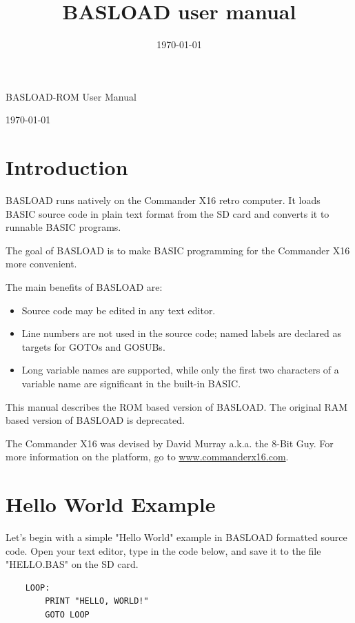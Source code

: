 \documentclass{article}
\title{BASLOAD user manual}
\date{\today}
\begin{document}
\begin{huge}
    BASLOAD-ROM User Manual
\end{huge}

\vspace{1em}
\today

\vspace{4em}
\tableofcontents
\vspace{4em}

\section{Introduction}

    BASLOAD runs natively on the Commander X16 retro computer. It loads BASIC 
    source code in plain text format from the SD card and converts it to 
    runnable BASIC programs.

    The goal of BASLOAD is to make BASIC programming for the Commander X16 more convenient.

    The main benefits of BASLOAD are:

    \begin{itemize}
        \item Source code may be edited in any text editor.
        \item Line numbers are not used in the source code; named labels are 
              declared as targets for GOTOs and GOSUBs.
        \item Long variable names are supported, while only the first two 
              characters of a variable name are significant in the built-in 
              BASIC.
    \end{itemize}
    
    This manual describes the ROM based version of BASLOAD. The original RAM
    based version of BASLOAD is deprecated.

    The Commander X16 was devised by David Murray a.k.a. the 
    8-Bit Guy. For more information on the platform, go to 
    \href{http://www.commanderx16.com}{www.commanderx16.com}.

\section{Hello World Example}

    Let's begin with a simple "Hello World" example in BASLOAD formatted
    source code. Open your text editor, type in the code below, and save it to
    the file "HELLO.BAS" on the SD card.

    \begin{verbatim}
    LOOP:
        PRINT "HELLO, WORLD!"
        GOTO LOOP
    \end{verbatim}
\end{document}
